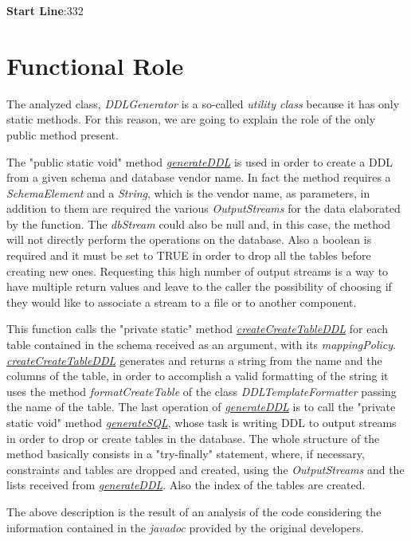 \documentclass[a4paper]{article}
\begin{document}
\textbf{Start Line}:332

\section{Functional Role}

The analyzed class, \textit{DDLGenerator} is a so-called \emph{utility class} because it has only static methods. For this reason, we are going to explain the role of the only public method present.

The "public static void" method \underline{\textit{generateDDL}} is used in order to create a DDL from a given schema and database vendor name. In fact the method requires a \textit{SchemaElement} and a \textit{String}, which is the vendor name, as parameters, in addition to them are required the various \textit{OutputStreams} for the data elaborated by the function. The \textit{dbStream} could also be null and, in this case, the method will not directly perform the operations on the database. Also a boolean is required and it must be set to TRUE in order to drop all the tables before creating new ones.
Requesting this high number of output streams is a way to have multiple return values and leave to the caller the possibility of choosing if they would like to associate a stream to a file or to another component.

This function calls the "private static" method \underline{\textit{createCreateTableDDL}} for each table contained in the schema received as an argument, with its \textit{mappingPolicy}. \underline{\textit{createCreateTableDDL}} generates and returns a string from the name and the columns of the table, in order to accomplish a valid formatting of the string it uses the method \textit{formatCreateTable} of the class \textit{DDLTemplateFormatter} passing the name of the table. The last operation of \underline{\textit{generateDDL}} is to call the "private static void" method \underline{\textit{generateSQL}}, whose task is writing DDL to output streams in order to drop or create tables in the database. The whole structure of the method basically consists in a "try-finally" statement, where, if necessary, constraints and tables are dropped and created, using the \textit{OutputStreams} and the lists received from \underline{\textit{generateDDL}}. Also the index of the tables are created. 

The above description is the result of an analysis of the code considering the information contained in the \textit{javadoc} provided by the original developers.
\end{document}
